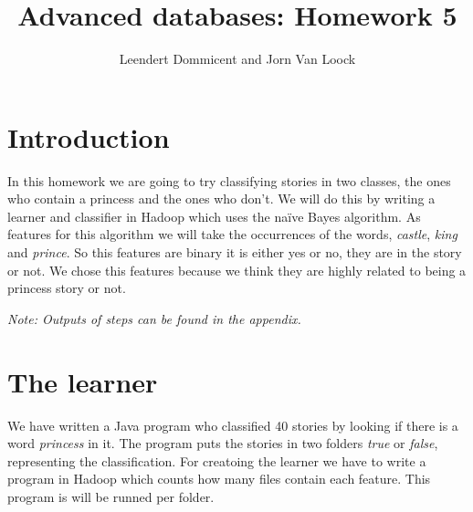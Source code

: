 \documentclass{article}
\title{Advanced databases: Homework 5}
\author{Leendert Dommicent and Jorn Van Loock}
\begin{document}
\maketitle
\setlength{\parskip}{8pt}
\setlength{\parindent}{0pt}
\section{Introduction}
In this homework we are going to try classifying stories in two classes, the ones who contain a princess and the ones who don't. We will do this by writing a learner and classifier in Hadoop which uses the na\"ive Bayes algorithm. As features for this algorithm we will take the occurrences of the words, \textit{castle}, \textit{king} and \textit{prince}. So this features are binary it is either yes or no, they are in the story or not. We chose this features because we think they are highly related to being a princess story or not.
\par
\textit{Note: Outputs of steps can be found in the appendix.}
\section{The learner}
We have written a Java program who classified 40 stories by looking if there is a word \textit{princess} in it. The program puts the stories in two folders \textit{true} or \textit{false}, representing the classification. For creatoing the learner we have to write a program in Hadoop which counts how many files contain each feature. This program is will be runned per folder.
\end{document}
